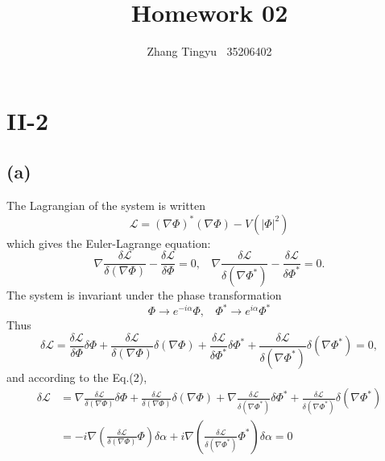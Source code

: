 \documentclass[12pt]{article}
\title{Homework 02}
\author{Zhang Tingyu $\ $ 35206402}
\begin{document}
\maketitle

\section*{II-2}

\subsection*{(a)}

The Lagrangian of the system is written
\begin{equation}
    \mathcal{L}=(\nabla\Phi)^*(\nabla\Phi)-V(|\Phi|^2)
\end{equation}
which gives the Euler-Lagrange equation:
\begin{equation}
    \nabla\frac{\delta\mathcal{L}}{\delta(\nabla\Phi)}-\frac{\delta
    \mathcal{L}}{\delta\Phi}=0,\ \ \ \ 
    \nabla\frac{\delta\mathcal{L}}{\delta(\nabla\Phi^*)}-\frac{\delta
    \mathcal{L}}{\delta\Phi^*}=0.
\end{equation}
The system is invariant under the phase transformation
\begin{equation*}
    \Phi\rightarrow e^{-i\alpha}\Phi,\ \ \ \ 
    \Phi^*\rightarrow e^{i\alpha}\Phi^*
\end{equation*}
Thus
\begin{equation}
    \delta\mathcal{L}=\frac{\delta\mathcal{L}}{\delta\Phi}\delta\Phi+
    \frac{\delta\mathcal{L}}{\delta(\nabla\Phi)}\delta(\nabla\Phi)+
    \frac{\delta\mathcal{L}}{\delta\Phi^*}\delta\Phi^*+
    \frac{\delta\mathcal{L}}{\delta(\nabla\Phi^*)}\delta(\nabla\Phi^*)=0,
\end{equation}
and according to the Eq.(2), 
\begin{equation}
    \begin{split}
        \delta\mathcal{L}&=\nabla\frac{\delta\mathcal{L}}{\delta(\nabla\Phi)}
        \delta\Phi+\frac{\delta\mathcal{L}}{\delta(\nabla\Phi)}\delta(\nabla
        \Phi)+\nabla\frac{\delta\mathcal{L}}{\delta(\nabla\Phi^*)}\delta\Phi^*+
        \frac{\delta\mathcal{L}}{\delta(\nabla\Phi^*)}\delta(\nabla\Phi^*)\\
        &=-i\nabla(\frac{\delta\mathcal{L}}{\delta(\nabla\Phi)}\Phi)\delta\alpha
        +i\nabla(\frac{\delta\mathcal{L}}{\delta(\nabla\Phi^*)}\Phi^*)\delta
        \alpha=0
    \end{split}
\end{equation}
\end{document}
